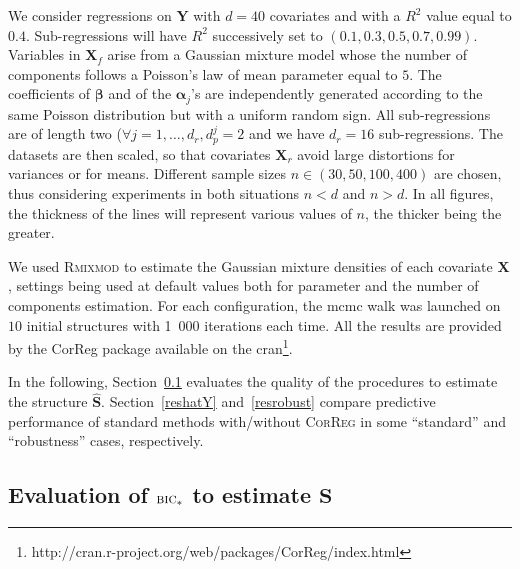 \documentclass[11pt,a4paper]{article}
\begin{document}
We consider regressions on $\boldsymbol{Y}$ with $d=40$ covariates and with a $R^2$ value equal to $0.4$. Sub-regressions will have $R^2$ successively set to $(0.1,0.3,0.5,0.7,0.99)$. Variables in $\boldsymbol{X}_f$ arise from a Gaussian mixture model whose the number of components follows a Poisson's law of mean parameter equal to $5$. The coefficients of $\boldsymbol{\beta}$ and of the $\boldsymbol{\alpha}_j$'s are independently generated according to the same Poisson distribution but with a uniform random sign. All sub-regressions are of length two ($\forall j=1,\ldots,d_r, d_p^j=2$ and we have $d_r=16$ sub-regressions. The datasets are then scaled, so that covariates $\boldsymbol{X}_r$ avoid large distortions for variances or for means.	Different sample sizes  $n\in (30,50,100,400)$ are chosen, thus considering experiments in both situations $n<d$ and $n>d$. In all figures, the thickness of the lines will represent various values of $n$, the thicker being the greater.

We used \textsc{Rmixmod} \cite{remi:hal-00919486} to estimate the Gaussian mixture densities of each covariate $\boldsymbol{X}$, settings being used at default values both for parameter and the number of components estimation. For each configuration, the {\sc mcmc} walk was launched on $10$ initial structures with 1~000 iterations each time. All the results are provided by the {\sc CorReg} package available on the {\sc cran}\footnote{http://cran.r-project.org/web/packages/CorReg/index.html}.

\vspace{3mm}	

In the following, Section~\ref{sec:simS} evaluates the quality of the  procedures to estimate the structure $\hat{\boldsymbol{S}}$. Section~\ref{reshatY} and~\ref{resrobust} compare predictive performance of standard methods with/without \textsc{CorReg} in some ``standard'' and ``robustness'' cases, respectively. 
	

	
		
	
		\subsection{Evaluation of $\mbox{\sc bic}_*$ to estimate $\boldsymbol{S}$}\label{sec:simS}
\end{document}
